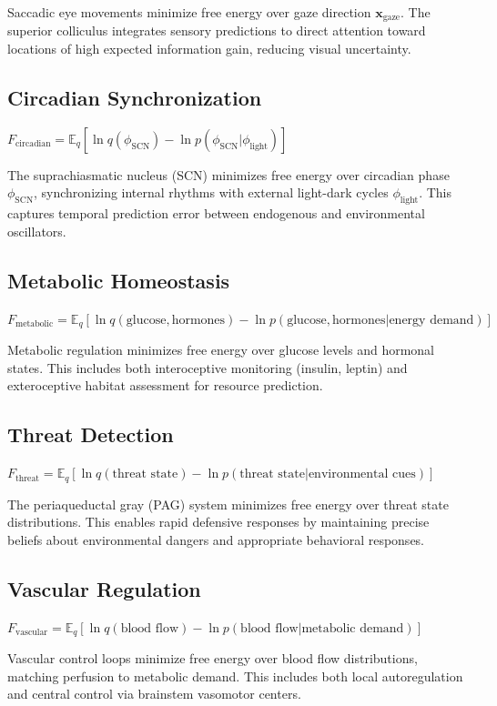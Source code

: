 \documentclass[11pt]{article}
\begin{document}
Saccadic eye movements minimize free energy over gaze direction $\mathbf{x}_{\text{gaze}}$. The superior colliculus integrates sensory predictions to direct attention toward locations of high expected information gain, reducing visual uncertainty.

\subsection{Circadian Synchronization}
$F_{\text{circadian}} = \mathbb{E}_q[\ln q(\phi_{\text{SCN}}) - \ln p(\phi_{\text{SCN}}|\phi_{\text{light}})]$

The suprachiasmatic nucleus (SCN) minimizes free energy over circadian phase $\phi_{\text{SCN}}$, synchronizing internal rhythms with external light-dark cycles $\phi_{\text{light}}$. This captures temporal prediction error between endogenous and environmental oscillators.

\subsection{Metabolic Homeostasis}
$F_{\text{metabolic}} = \mathbb{E}_q[\ln q(\text{glucose}, \text{hormones}) - \ln p(\text{glucose}, \text{hormones}|\text{energy demand})]$

Metabolic regulation minimizes free energy over glucose levels and hormonal states. This includes both interoceptive monitoring (insulin, leptin) and exteroceptive habitat assessment for resource prediction.

\subsection{Threat Detection}
$F_{\text{threat}} = \mathbb{E}_q[\ln q(\text{threat state}) - \ln p(\text{threat state}|\text{environmental cues})]$

The periaqueductal gray (PAG) system minimizes free energy over threat state distributions. This enables rapid defensive responses by maintaining precise beliefs about environmental dangers and appropriate behavioral responses.

\subsection{Vascular Regulation}
$F_{\text{vascular}} = \mathbb{E}_q[\ln q(\text{blood flow}) - \ln p(\text{blood flow}|\text{metabolic demand})]$

Vascular control loops minimize free energy over blood flow distributions, matching perfusion to metabolic demand. This includes both local autoregulation and central control via brainstem vasomotor centers.
\end{document}
